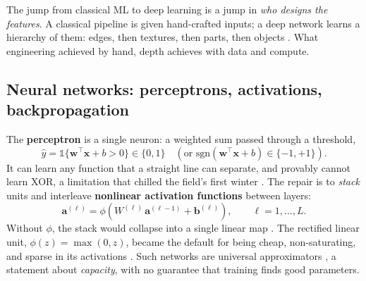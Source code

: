 \documentclass[11pt,a4paper]{article}
\begin{document}
	The jump from classical ML to deep learning is a jump in \emph{who
		designs the features}. A classical pipeline is given hand-crafted
	inputs; a deep network learns a hierarchy of them: edges, then
	textures, then parts, then objects \parencite{lecun2015}. What
	engineering achieved by hand, depth achieves with data and compute.
	
	\subsection{Neural networks: perceptrons, activations, backpropagation}
	
	The \textbf{perceptron} \parencite{rosenblatt1958} is a single neuron:
	a weighted sum passed through a threshold,
	\begin{equation}
		\hat{y} = \mathbb{1}\{\mathbf{w}^{\!\top}\mathbf{x} + b > 0\} \in \{0, 1\}
		\quad (\text{or }\mathrm{sgn}(\mathbf{w}^{\!\top}\mathbf{x} + b) \in \{-1, +1\}).
	\end{equation}
	It can learn any function that a straight line can separate, and
	provably cannot learn XOR, a limitation that chilled the field's first
	winter \parencite{minsky1969}. The repair is to \emph{stack} units and
	interleave \textbf{nonlinear activation functions} between layers:
	\begin{equation}
		\mathbf{a}^{(\ell)} = \phi\!\left(W^{(\ell)}\,\mathbf{a}^{(\ell-1)} +
		\mathbf{b}^{(\ell)}\right),
		\qquad \ell = 1, \dots, L .
	\end{equation}
	Without $\phi$, the stack would collapse into a single linear map \parencite{strang2012linear}. The
	rectified linear unit, $\phi(z) = \max(0, z)$, became the default for
	being cheap, non-saturating, and sparse in its activations
	\parencite{nair2010}. Such networks are universal approximators
	\parencite{hornik1989}, a statement about \emph{capacity}, with no
	guarantee that training finds good parameters.
	
\end{document}
